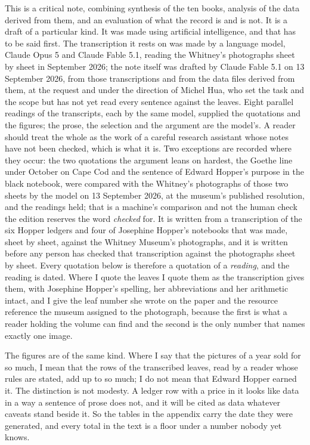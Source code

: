 This is a critical note, combining synthesis of the ten books, analysis of the data derived from them, and an evaluation of what the record is and is not. It is a draft of a particular kind. It was made using artificial intelligence, and that has to be said first. The transcription it rests on was made by a language model, Claude Opus 5 and Claude Fable 5.1, reading the Whitney's photographs sheet by sheet in September 2026; the note itself was drafted by Claude Fable 5.1 on 13 September 2026, from those transcriptions and from the data files derived from them, at the request and under the direction of Michel Hua, who set the task and the scope but has not yet read every sentence against the leaves. Eight parallel readings of the transcripts, each by the same model, supplied the quotations and the figures; the prose, the selection and the argument are the model's. A reader should treat the whole as the work of a careful research assistant whose notes have not been checked, which is what it is. Two exceptions are recorded where they occur: the two quotations the argument leans on hardest, the Goethe line under October on Cape Cod and the sentence of Edward Hopper's purpose in the black notebook, were compared with the Whitney's photographs of those two sheets by the model on 13 September 2026, at the museum's published resolution, and the readings held; that is a machine's comparison and not the human check the edition reserves the word \emph{checked} for. It is written from a transcription of the six Hopper ledgers and four of Josephine Hopper's notebooks that was made, sheet by sheet, against the Whitney Museum's photographs, and it is written before any person has checked that transcription against the photographs sheet by sheet. Every quotation below is therefore a quotation of a \emph{reading}, and the reading is dated. Where I quote the leaves I quote them as the transcription gives them, with Josephine Hopper's spelling, her abbreviations and her arithmetic intact, and I give the leaf number she wrote on the paper and the resource reference the museum assigned to the photograph, because the first is what a reader holding the volume can find and the second is the only number that names exactly one image.

The figures are of the same kind. Where I say that the pictures of a year sold for so much, I mean that the rows of the transcribed leaves, read by a reader whose rules are stated, add up to so much; I do not mean that Edward Hopper earned it. The distinction is not modesty. A ledger row with a price in it looks like data in a way a sentence of prose does not, and it will be cited as data whatever caveats stand beside it. So the tables in the appendix carry the date they were generated, and every total in the text is a floor under a number nobody yet knows.

